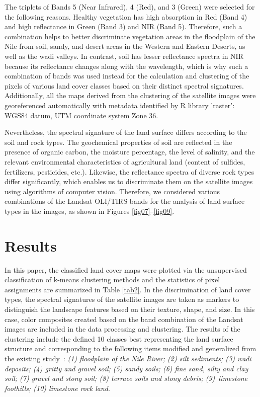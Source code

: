 \documentclass[information,article,accept,pdftex,moreauthors]{Definitions/mdpi}
\begin{document}
The triplets of Bands 5 (Near Infrared), 4 (Red), and 3 (Green) were selected for the following reasons. Healthy vegetation has high absorption in Red (Band 4) and high reflectance in Green (Band 3) and NIR (Band 5). Therefore, such a combination helps to better discriminate vegetation areas in the floodplain of the Nile from soil, sandy, and desert areas in the Western and Eastern Deserts, as well as the wadi valleys. In contrast, soil has lesser reflectance spectra in NIR because its reflectance changes along with the wavelength{, which is why }such a combination of bands was used {instead for the calculation and clustering }of the pixels of various land cover classes based on their distinct spectral signatures. {Additionally, all }the maps derived from the clustering of the satellite images were georeferenced automatically with metadata identified by R library 'raster': WGS84 datum, UTM coordinate system Zone 36.

Nevertheless, {the }spectral signature of the land surface differs according to the soil and rock types. The geochemical properties of soil are reflected in the presence of organic carbon, the moisture percentage, the level of salinity, and the relevant environmental characteristics of agricultural land (content of sulfides, fertilizers, pesticides, etc.). Likewise, the reflectance spectra of diverse rock types {differ }significantly, which enables us to discriminate them on the satellite images using algorithms of computer vision. Therefore, we considered various combinations of the Landsat OLI/TIRS bands for the analysis of land surface types in the images, as shown in Figures \ref{fig07}--\ref{fig09}.

\section{Results}

In this paper, the classified land cover maps were plotted via the unsupervised classification of k-means clustering methods and the statistics of pixel assignments are summarized in Table \ref{tab2}. {In the discrimination of land cover types, the spectral signatures of the satellite images are taken as markers to distinguish the landscape features based on their texture, shape, and size. In this case, color composites created based on the band combination of the Landsat images are included in the data processing and clustering. }The results of the clustering include the defined 10 classes best representing the land surface structure and corresponding to the following items modified and generalized from the existing study~\cite{Kamel}: \emph{(1) floodplain of the Nile River; (2) silt sediments; (3) wadi deposits; (4) gritty and gravel soil;  (5) sandy soils; (6) fine sand, silty and clay soil; (7) gravel and stony soil; (8) terrace soils and stony debris; (9)~limestone foothills; 
(10) limestone rock land}. 
\end{document}
